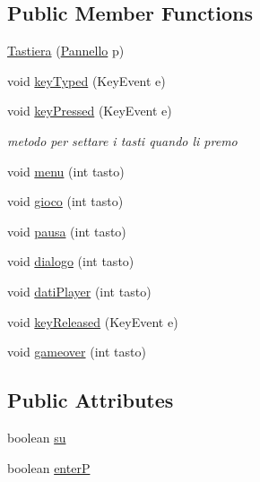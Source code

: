 \subsection*{Public Member Functions}
\begin{DoxyCompactItemize}
\item 
\hyperlink{classa_1_1survival_1_1game_1_1_tastiera_a300aa761b68ebe65b1c03dd49483e2bd}{Tastiera} (\hyperlink{classa_1_1survival_1_1game_1_1_pannello}{Pannello} p)
\item 
void \hyperlink{classa_1_1survival_1_1game_1_1_tastiera_ae9358abc251c2552e1f2c743d881df8d}{key\+Typed} (Key\+Event e)
\item 
void \hyperlink{classa_1_1survival_1_1game_1_1_tastiera_aa12eb1084be2c4d9b03d5f248f00900d}{key\+Pressed} (Key\+Event e)
\begin{DoxyCompactList}\small\item\em metodo per settare i tasti quando li premo \end{DoxyCompactList}\item 
void \hyperlink{classa_1_1survival_1_1game_1_1_tastiera_a9084c4a99060ee721903b329b8028971}{menu} (int tasto)
\item 
void \hyperlink{classa_1_1survival_1_1game_1_1_tastiera_a8b74f3af7a41bc6d69584817b83a067c}{gioco} (int tasto)
\item 
void \hyperlink{classa_1_1survival_1_1game_1_1_tastiera_ae1955cea10e34f2e5f1df55d2a18cce7}{pausa} (int tasto)
\item 
void \hyperlink{classa_1_1survival_1_1game_1_1_tastiera_a511fbdea77021f4250410b5565a4a663}{dialogo} (int tasto)
\item 
void \hyperlink{classa_1_1survival_1_1game_1_1_tastiera_afdd8d3c804439a86dbe018e7b23878f1}{dati\+Player} (int tasto)
\item 
void \hyperlink{classa_1_1survival_1_1game_1_1_tastiera_af9e79ab3bcfe3fa9df90b04135486f5b}{key\+Released} (Key\+Event e)
\item 
void \hyperlink{classa_1_1survival_1_1game_1_1_tastiera_a6e3f5b499ce8fa385ff315cd3115e6b7}{gameover} (int tasto)
\end{DoxyCompactItemize}
\subsection*{Public Attributes}
\begin{DoxyCompactItemize}
\item 
boolean \hyperlink{classa_1_1survival_1_1game_1_1_tastiera_aff855f281d61fe7d477455d95672ad77}{su}
\item 
boolean \hyperlink{classa_1_1survival_1_1game_1_1_tastiera_a7aff3cc547651aaaee522d917b29bf08}{enterP}
\end{DoxyCompactItemize}


